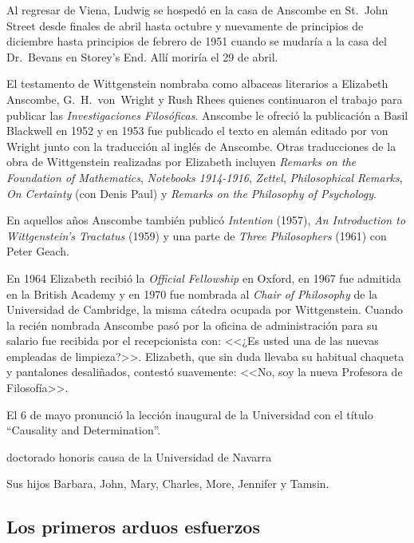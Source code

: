 Al regresar de Viena, Ludwig se hospedó en la casa de Anscombe en St.~John Street desde finales de abril hasta octubre y nuevamente de principios de diciembre hasta principios de febrero de 1951 cuando se mudaría a la casa del Dr.~Bevans en Storey's End.\autocite[cf.~][loc. 11242]{monk} Allí moriría el 29 de abril.

El testamento de Wittgenstein nombraba como albaceas literarios a Elizabeth Anscombe, G.~H.~von~Wright y Rush Rhees quienes continuaron el trabajo para publicar las \emph{Investigaciones Filosóficas}. Anscombe le ofreció la publicación a Basil Blackwell en 1952 y en 1953 fue publicado el texto en alemán editado por von Wright junto con la traducción al inglés de Anscombe. Otras traducciones de la obra de Wittgenstein realizadas por Elizabeth incluyen \emph{Remarks on the Foundation of Mathematics}, \emph{Notebooks 1914-1916}, \emph{Zettel}, \emph{Philosophical Remarks}, \emph{On Certainty} (con Denis Paul) y \emph{Remarks on the Philosophy of Psychology}.\autocite[Cf.~][38]{teichman2002fellows}

En aquellos años Anscombe también publicó \emph{Intention} (1957), \emph{An Introduction to Wittgenstein's Tractatus} (1959) y una parte de \emph{Three Philosophers} (1961) con Peter Geach.\autocite[Cf.~][39]{teichman2002fellows}

En 1964 Elizabeth recibió la \emph{Official Fellowship} en Oxford, en 1967 fue admitida en la British Academy y en 1970 fue nombrada al \emph{Chair of Philosophy} de la Universidad de Cambridge, la misma cátedra ocupada por Wittgenstein. Cuando la recién nombrada Anscombe pasó por la oficina de administración para su salario fue recibida por el recepcionista con: <<¿Es usted una de las nuevas empleadas de limpieza?>>. Elizabeth, que sin duda llevaba su habitual chaqueta y pantalones desaliñados, contestó suavemente: <<No, soy la nueva Profesora de Filosofía>>.\autocite[cfr.~][p.~37]{teichman2002fellows}

El 6 de mayo pronunció la lección inaugural de la Universidad con el título ``Causality and Determination''.

doctorado honoris causa de la Universidad de Navarra

Sus hijos Barbara, John, Mary, Charles, More, Jennifer y Tamsin.

\subsection{Los primeros arduos esfuerzos}

